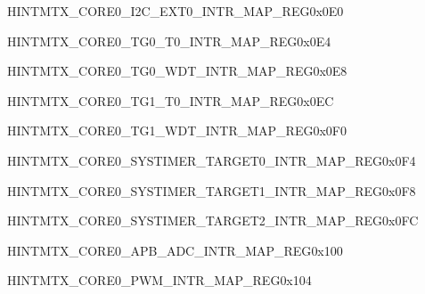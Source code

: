 \begin{register}{H}{INTMTX\_CORE0\_I2C\_EXT0\_INTR\_MAP\_REG}{0x0E0}\label{regdesc:INTMTXCORE0I2CEXT0INTRMAPREG} \end{register}\vspace{-3em}
\begin{register}{H}{INTMTX\_CORE0\_TG0\_T0\_INTR\_MAP\_REG}{0x0E4}\label{regdesc:INTMTXCORE0TG0T0INTRMAPREG} \end{register}\vspace{-3em}
\begin{register}{H}{INTMTX\_CORE0\_TG0\_WDT\_INTR\_MAP\_REG}{0x0E8}\label{regdesc:INTMTXCORE0TG0WDTINTRMAPREG} \end{register}\vspace{-3em}
\begin{register}{H}{INTMTX\_CORE0\_TG1\_T0\_INTR\_MAP\_REG}{0x0EC}\label{regdesc:INTMTXCORE0TG1T0INTRMAPREG} \end{register}\vspace{-3em}
\begin{register}{H}{INTMTX\_CORE0\_TG1\_WDT\_INTR\_MAP\_REG}{0x0F0}\label{regdesc:INTMTXCORE0TG1WDTINTRMAPREG} \end{register}\vspace{-3em}
\begin{register}{H}{INTMTX\_CORE0\_SYSTIMER\_TARGET0\_INTR\_MAP\_REG}{0x0F4}\label{regdesc:INTMTXCORE0SYSTIMERTARGET0INTRMAPREG} \end{register}\vspace{-3em}
\begin{register}{H}{INTMTX\_CORE0\_SYSTIMER\_TARGET1\_INTR\_MAP\_REG}{0x0F8}\label{regdesc:INTMTXCORE0SYSTIMERTARGET1INTRMAPREG} \end{register}\vspace{-3em}
\begin{register}{H}{INTMTX\_CORE0\_SYSTIMER\_TARGET2\_INTR\_MAP\_REG}{0x0FC}\label{regdesc:INTMTXCORE0SYSTIMERTARGET2INTRMAPREG} \end{register}\vspace{-3em}
\begin{register}{H}{INTMTX\_CORE0\_APB\_ADC\_INTR\_MAP\_REG}{0x100}\label{regdesc:INTMTXCORE0APBADCINTRMAPREG} \end{register}\vspace{-3em}
\begin{register}{H}{INTMTX\_CORE0\_PWM\_INTR\_MAP\_REG}{0x104}\label{regdesc:INTMTXCORE0PWMINTRMAPREG} \end{register}\vspace{-3em}
